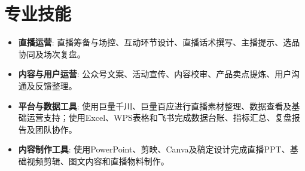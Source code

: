 \documentclass[a4paper,11pt]{article}
\begin{document}
\section*{专业技能}
\begin{itemize}[leftmargin=*,itemsep=2pt]
  \item \textbf{直播运营}: 直播筹备与场控、互动环节设计、直播话术撰写、主播提示、选品协同及场次复盘。
  \item \textbf{内容与用户运营}: 公众号文案、活动宣传、内容校审、产品卖点提炼、用户沟通及反馈整理。
  \item \textbf{平台与数据工具}: 使用巨量千川、巨量百应进行直播素材整理、数据查看及基础运营支持；使用Excel、WPS表格和飞书完成数据台账、指标汇总、复盘报告及团队协作。
  \item \textbf{内容制作工具}: 使用PowerPoint、剪映、Canva及稿定设计完成直播PPT、基础视频剪辑、图文内容和直播物料制作。
\end{itemize}
\end{document}
